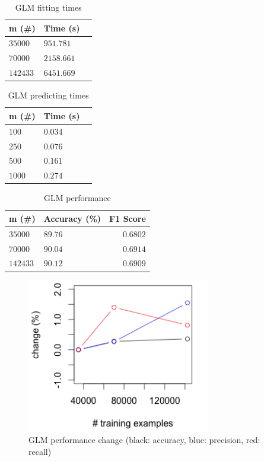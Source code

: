 \documentclass[twoside]{article}
\begin{document}
\begin{multicols}{2}
\begin{table}[H]
\caption{GLM fitting times}
\centering
\begin{tabular}{llr}
\toprule
m (\#) & Time (s) \\
\midrule
$35000$ & $951.781$ \\
$70000$ & $2158.661$ \\
$142433$ & $6451.669$ \\
\bottomrule
\end{tabular}
\end{table}

\begin{table}[H]
\caption{GLM predicting times}
\centering
\begin{tabular}{llr}
\toprule
m (\#) & Time (s) \\
\midrule
$100$ & $0.034$ \\
$250$ & $0.076$ \\
$500$ & $0.161$ \\
$1000$ & $0.274$ \\
\bottomrule
\end{tabular}
\end{table}

\begin{table}[H]
\caption{GLM performance}
\centering
\begin{tabular}{llr}
\toprule
m (\#) & Accuracy (\%) & F1 Score \\
\midrule
$35000$ & $89.76$ & $0.6802$ \\
$70000$ & $90.04$ & $0.6914$ \\
$142433$ & $90.12$ & $0.6909$ \\
\bottomrule
\end{tabular}
\end{table}

\begin{figure}[H]
 \caption{GLM performance change (black: accuracy, blue: precision, red: recall)}
  \centering
    \includegraphics[width=8cm]{../data/glm_change}
\end{figure}


\end{multicols}
\end{document}
